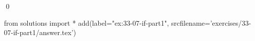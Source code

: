 
\begin{ex}
  \label{ex:33-07-if-part1}
  
  \qed
\end{ex}
\begin{python0}
from solutions import *
add(label="ex:33-07-if-part1",
    srcfilename='exercises/33-07-if-part1/answer.tex')
\end{python0}
